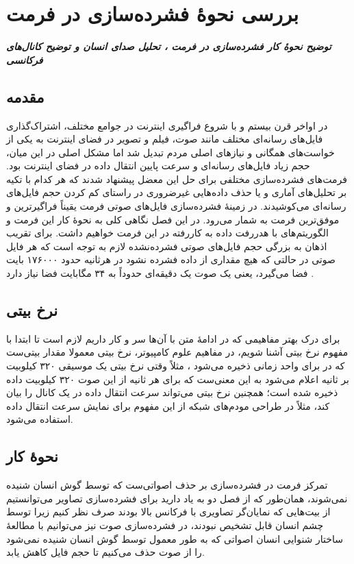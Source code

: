 \chapter{بررسی نحوهٔ فشرده‌سازی در فرمت }
\noindent
\textbf{
	\textit{
        توضیح نحوهٔ کار فشرده‌سازی در فرمت ،
        تحلیل صدای انسان و توضیح کانال‌های فرکانسی
	}
}
\pagebreak

\section{ مقدمه}
در اواخر قرن بیستم و با شروع فراگیری اینترنت در جوامع مختلف، اشتراک‌گذاری 
فایل‌های رسانه‌ای مختلف مانند صوت، فیلم و تصویر در فضای اینترنت به یکی از خواست‌های همگانی و نیازهای اصلی مردم تبدیل شد اما 
مشکل اصلی در این میان، حجم زیاد فایل‌های رسانه‌ای و سرعت پایین انتقال داده در فضای اینترنت بود.
فرمت‌های فشرده‌سازی مختلفی برای حل این معضل پیشنهاد شدند که هر کدام با تکیه بر
تحلیل‌های آماری و یا حذف داده‌هایی غیرضروری در راستای کم کردن حجم فایل‌های رسانه‌ای می‌کوشیدند. در زمینهٔ  فشرده‌سازی فایل‌های
صوتی فرمت  یقیناً فراگیرترین و موفق‌ترین فرمت به شمار می‌رود. در این فصل 
نگاهی کلی به نحوهٔ کار این فرمت و الگوریتم‌های با هدررفت داده به کاررفته در این فرمت خواهیم داشت. برای تقریب اذهان به بزرگی حجم فایل‌های صوتی فشرده‌نشده لازم به توجه است که هر
فایل صوتی در حالتی که هیچ مقداری از داده فشرده نشود در هرثانیه حدود ۱۷۶۰۰۰ بایت فضا می‌گیرد، یعنی یک صوت
یک دقیقه‌ای حدوداً به ۳۴ مگابایت فضا نیاز دارد \cite{uncompressed_source}.

\section{نرخ بیتی } 
برای درک بهتر مفاهیمی که در ادامهٔ متن با آن‌ها سر و کار داریم لازم است تا ابتدا با مفهوم نرخ بیتی  آشنا شویم، در مفاهیم علوم کامپیوتر، نرخ بیتی
معمولا  مقدار بیتی‌ست که در برای واحد زمانی ذخیره می‌شود \cite{bitrate_definition}، مثلاً وقتی نرخ بیتی یک موسیقی 
۳۲۰ کیلوبیت بر ثانیه
اعلام می‌شود به این معنی‌ست که برای هر ثانیه از این صوت ۳۲۰ کیلوبیت داده ذخیره شده است؛ همچنین نرخ بیتی می‌تواند سرعت انتقال داده در یک
کانال را بیان کند،‌ مثلاً در طراحی مودم‌های شبکه از این مفهوم برای نمایش سرعت انتقال داده استفاده می‌شود. 

\section{نحوهٔ کار }
تمرکز فرمت  در فشرده‌سازی 
بر حذف اصواتی‌ست که توسط گوش انسان شنیده نمی‌شوند،‌ همان‌طور که از فصل دو به یاد دارید برای فشرده‌سازی تصاویر می‌توانستیم از بیت‌هایی که 
نمایان‌گر تصاویری با فرکانس بالا بودند صرف نظر کنیم زیرا توسط چشم انسان قابل تشخیص نبودند،‌ در فشرده‌سازی صوت نیز می‌توانیم 
 با مطالعهٔ ساختار شنوایی انسان اصواتی که به طور معمول توسط گوش انسان شنیده نمی‌شود را از صوت حذف می‌کنیم تا حجم فایل کاهش یابد.

